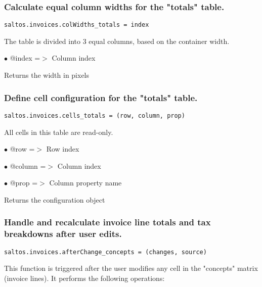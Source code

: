 \documentclass[a4paper]{article}
\begin{document}
\hypertarget{toc151}{}
\subsubsection{Calculate equal column widths for the "totals" table.}

\begin{lstlisting}
saltos.invoices.colWidths_totals = index
\end{lstlisting}

The table is divided into 3 equal columns, based on the container width.

\begin{compactitem}
\item[\color{myblue}$\bullet$] @index =$>$ Column index
\end{compactitem}

Returns the width in pixels

\hypertarget{toc152}{}
\subsubsection{Define cell configuration for the "totals" table.}

\begin{lstlisting}
saltos.invoices.cells_totals = (row, column, prop)
\end{lstlisting}

All cells in this table are read-only.

\begin{compactitem}
\item[\color{myblue}$\bullet$] @row    =$>$ Row index
\item[\color{myblue}$\bullet$] @column =$>$ Column index
\item[\color{myblue}$\bullet$] @prop   =$>$ Column property name
\end{compactitem}

Returns the configuration object

\hypertarget{toc153}{}
\subsubsection{Handle and recalculate invoice line totals and tax breakdowns after user edits.}

\begin{lstlisting}
saltos.invoices.afterChange_concepts = (changes, source)
\end{lstlisting}

This function is triggered after the user modifies any cell in the "concepts" matrix
(invoice lines). It performs the following operations:
\end{document}
